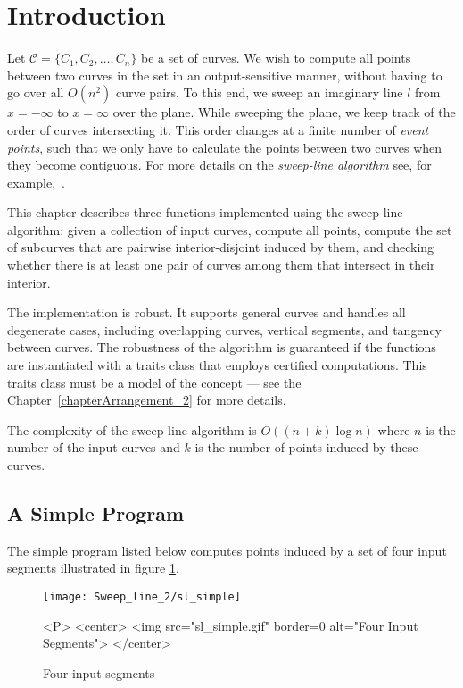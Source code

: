 \section{Introduction}

Let ${\mathcal C} = \{C_1, C_2, \ldots, C_n\}$ be a set of curves.
We wish to compute all  points between
two curves in the set in an output-sensitive manner, without having to
go over all $O(n^2)$ curve pairs. To this end, we sweep an imaginary line $l$
from $x = -\infty$ to $x = \infty$ over the plane. While sweeping
the plane, we keep track of the order of curves intersecting it.
This order changes at a finite number of \emph{event points}, such that
we only have to calculate the  points
between two curves when they become contiguous. For more details on the
\emph{sweep-line algorithm} see, for example,~\cite[Chapter~2]{bkos-cgaa-00}.

This chapter describes three functions implemented using the sweep-line
algorithm: given a collection of input curves, compute all  points,
compute the set of subcurves that are pairwise interior-disjoint induced by them,
and checking whether there is at least one pair of curves among them that intersect in their interior.

The implementation is robust. It supports general
curves and handles all degenerate cases, including overlapping curves,
vertical segments, and tangency between curves. The robustness of the
algorithm is guaranteed if the functions are instantiated with a traits
class that employs certified computations. This traits class must be a model
of the  concept --- see the
Chapter~\ref{chapterArrangement_2} for more details.

The complexity of the sweep-line algorithm is $O((n + k)\log{n})$ where $n$
is the  number of the input curves and $k$ is the number of
 points induced by these curves.

\subsection{A Simple Program}
The simple program listed below computes  points induced by 
a set of four input segments illustrated in figure \ref{SL_sec:simple}.

\begin{figure}[hbp]
\begin{ccTexOnly}
\centerline{\texttt{[image: Sweep\_line\_2/sl\_simple]}}
\end{ccTexOnly}

\begin{ccHtmlOnly}
<P>
<center>
  <img src="sl_simple.gif" border=0 alt="Four Input Segments">
</center>
\end{ccHtmlOnly}
\begin{center}
\caption{Four input segments
\label{SL_sec:simple}}
\end{center}
\end{figure}

